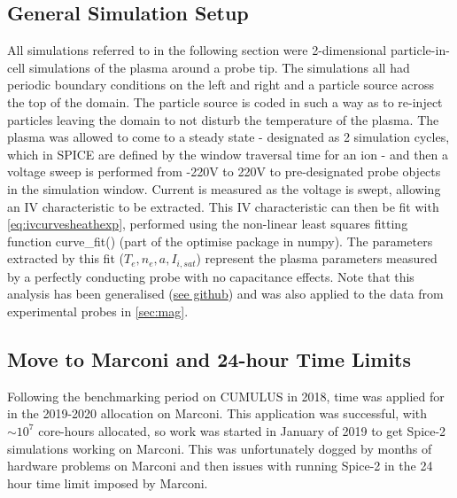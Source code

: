 \documentclass[a4paper, 12pt]{article} %
\begin{document}
\subsection{\label{ssec:sim_setup}General Simulation Setup}
	All simulations referred to in the following section were 2-dimensional particle-in-cell simulations of the plasma around a probe tip.
	The simulations all had periodic boundary conditions on the left and right and a particle source across the top of the domain. 
	The particle source is coded in such a way as to re-inject particles leaving the domain to not disturb the temperature of the plasma.
	The plasma was allowed to come to a steady state - designated as 2 simulation cycles, which in SPICE are defined by the window traversal time for an ion - and then a voltage sweep is performed from -220V to 220V to pre-designated probe objects in the simulation window. 
	Current is measured as the voltage is swept, allowing an IV characteristic to be extracted.
	This IV characteristic can then be fit with \cref{eq:ivcurvesheathexp}, performed using the non-linear least squares fitting function curve\_fit() (part of the optimise package in numpy).
	The parameters extracted by this fit ($T_e, n_e, a, I_{i, sat}$) represent the plasma parameters measured by a perfectly conducting probe with no capacitance effects. 
	Note that this analysis has been generalised (\hyperlink{https://github.com/jackleland/flopter}{see github}) and was also applied to the data from experimental probes in \cref{sec:mag}.

\subsection{\label{ssec:marconi}Move to Marconi and 24-hour Time Limits}
    Following the benchmarking period on CUMULUS in 2018, time was applied for in the 2019-2020 allocation on Marconi. 
    This application was successful, with $\sim10^{7}$ core-hours allocated, so work was started in January of 2019 to get Spice-2 simulations working on Marconi.
    This was unfortunately dogged by months of hardware problems on Marconi and then issues with running Spice-2 in the 24 hour time limit imposed by Marconi.
    
\end{document}
